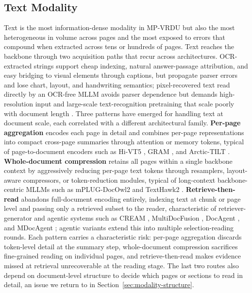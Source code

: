 \documentclass[11pt]{article}
\begin{document}
\subsection{Text Modality}
\label{sec:modality-text}

Text is the most information-dense modality in MP-VRDU but also the most heterogeneous in volume across pages and the most exposed to errors that compound when extracted across tens or hundreds of pages. Text reaches the backbone through two acquisition paths that recur across architectures. OCR-extracted strings support cheap indexing, natural answer-passage attribution, and easy bridging to visual elements through captions, but propagate parser errors and lose chart, layout, and handwriting semantics; pixel-recovered text read directly by an OCR-free MLLM avoids parser dependence but demands high-resolution input and large-scale text-recognition pretraining that scale poorly with document length \cite{kim2021donut,ye2023ureader}. Three patterns have emerged for handling text at document scale, each correlated with a different architectural family. \textbf{Per-page aggregation} encodes each page in detail and combines per-page representations into compact cross-page summaries through attention or memory tokens, typical of page-to-document encoders such as Hi-VT5 \cite{tito2023hierarchical}, GRAM \cite{blau2024gram}, and Arctic-TILT \cite{borchmann2025arctictilt}. \textbf{Whole-document compression} retains all pages within a single backbone context by aggressively reducing per-page text tokens through resamplers, layout-aware compressors, or token-reduction modules, typical of long-context backbone-centric MLLMs such as mPLUG-DocOwl2 \cite{hu2025mplugdocowl2} and TextHawk2 \cite{yu2024texthawk2}. \textbf{Retrieve-then-read} abandons full-document encoding entirely, indexing text at chunk or page level and passing only a retrieved subset to the reader, characteristic of retriever-generator and agentic systems such as CREAM \cite{zhang2024cream}, MultiDocFusion \cite{shin2025multidocfusion}, DocAgent \cite{sun2025docagent}, and MDocAgent \cite{han2025mdocagent}; agentic variants extend this into multiple selection-reading rounds. Each pattern carries a characteristic risk: per-page aggregation discards token-level detail at the summary step, whole-document compression sacrifices fine-grained reading on individual pages, and retrieve-then-read makes evidence missed at retrieval unrecoverable at the reading stage. The last two routes also depend on document-level structure to decide which pages or sections to read in detail, an issue we return to in Section~\ref{sec:modality-structure}.
\end{document}
